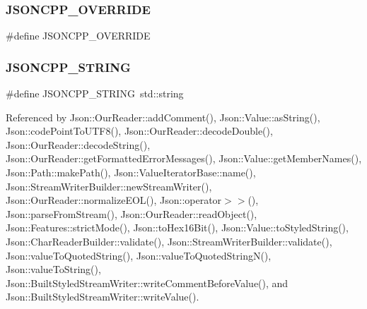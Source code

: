 \subsubsection{\texorpdfstring{J\+S\+O\+N\+C\+P\+P\+\_\+\+O\+V\+E\+R\+R\+I\+DE}{JSONCPP\_OVERRIDE}}
{\footnotesize\ttfamily \#define J\+S\+O\+N\+C\+P\+P\+\_\+\+O\+V\+E\+R\+R\+I\+DE}

\mbox{\label{json-forwards_8h_a1e723f95759de062585bc4a8fd3fa4be_a1e723f95759de062585bc4a8fd3fa4be}} 
\subsubsection{\texorpdfstring{J\+S\+O\+N\+C\+P\+P\+\_\+\+S\+T\+R\+I\+NG}{JSONCPP\_STRING}}
{\footnotesize\ttfamily \#define J\+S\+O\+N\+C\+P\+P\+\_\+\+S\+T\+R\+I\+NG~std\+::string}



Referenced by Json\+::\+Our\+Reader\+::add\+Comment(), Json\+::\+Value\+::as\+String(), Json\+::code\+Point\+To\+U\+T\+F8(), Json\+::\+Our\+Reader\+::decode\+Double(), Json\+::\+Our\+Reader\+::decode\+String(), Json\+::\+Our\+Reader\+::get\+Formatted\+Error\+Messages(), Json\+::\+Value\+::get\+Member\+Names(), Json\+::\+Path\+::make\+Path(), Json\+::\+Value\+Iterator\+Base\+::name(), Json\+::\+Stream\+Writer\+Builder\+::new\+Stream\+Writer(), Json\+::\+Our\+Reader\+::normalize\+E\+O\+L(), Json\+::operator$>$$>$(), Json\+::parse\+From\+Stream(), Json\+::\+Our\+Reader\+::read\+Object(), Json\+::\+Features\+::strict\+Mode(), Json\+::to\+Hex16\+Bit(), Json\+::\+Value\+::to\+Styled\+String(), Json\+::\+Char\+Reader\+Builder\+::validate(), Json\+::\+Stream\+Writer\+Builder\+::validate(), Json\+::value\+To\+Quoted\+String(), Json\+::value\+To\+Quoted\+String\+N(), Json\+::value\+To\+String(), Json\+::\+Built\+Styled\+Stream\+Writer\+::write\+Comment\+Before\+Value(), and Json\+::\+Built\+Styled\+Stream\+Writer\+::write\+Value().

